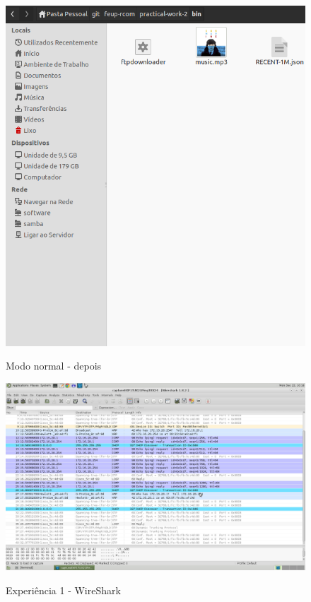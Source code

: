 \documentclass[a4paper]{article}
\begin{document}
\begin{figure}[h!]
\centering
\caption{Modo normal - depois}
\includegraphics[scale=0.35]{res/depois-modonormal.png}
\label{fig:depoisnormal}
\end{figure}

\pagebreak

\begin{figure}[h!]
\caption{Experiência 1 - WireShark}
\includegraphics[scale=0.25]{res/image2.png}
\label{fig:teste}
\end{figure}
\end{document}
